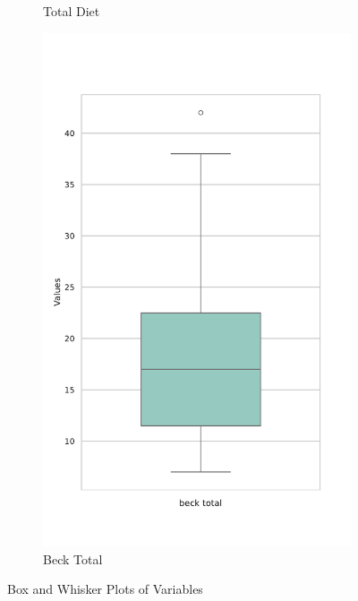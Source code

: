 \documentclass[jou]{apa7}
\newcommand{\subfigwidth}{0.2\textwidth}
\begin{document}
\begin{figure}[!ht]
\begin{subfigure}[b]{\subfigwidth}
		\caption{Total Diet}
		\label{fig:BoxPlotDietaTotal}
	\end{subfigure}
	\hspace{0.5em}
	\begin{subfigure}[b]{\subfigwidth}
		\centering
		\includegraphics[width=\linewidth]{Box_Plot_of_beck_total.pdf}
		\caption{Beck Total}
		\label{fig:BoxPlotBeckTotal}
	\end{subfigure}

	\caption{Box and Whisker Plots of Variables}
	\label{fig:BoxPlots}
\end{figure}
\end{document}
